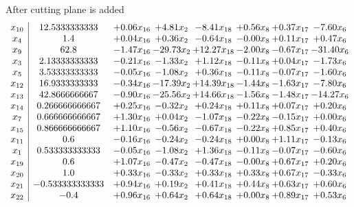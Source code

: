 \documentclass[8pt]{article}
\begin{document}
 After cutting plane is added 
\[\begin{array}{c| c c@{\hskip 2pt} c@{\hskip 2pt} c@{\hskip 2pt} c@{\hskip 2pt} c@{\hskip 2pt} c@{\hskip 2pt} }
 x_{10}   &  12.5333333333 & +  0.06 x_{16} & +  4.81 x_{2} & -8.41 x_{18} & +  0.56 x_{8} & +  0.37 x_{17} & -7.60 x_{6}\\
 x_{4}   &  1.4 & +  0.04 x_{16} & +  0.36 x_{2} & -0.64 x_{18} & -0.00 x_{8} & +  0.11 x_{17} & +  0.47 x_{6}\\
 x_{9}   &  62.8 & -1.47 x_{16} & -29.73 x_{2} & + 12.27 x_{18} & -2.00 x_{8} & -0.67 x_{17} & -31.40 x_{6}\\
 x_{3}   &  2.13333333333 & -0.21 x_{16} & -1.33 x_{2} & +  1.12 x_{18} & -0.11 x_{8} & +  0.04 x_{17} & -1.73 x_{6}\\
 x_{5}   &  3.53333333333 & -0.05 x_{16} & -1.08 x_{2} & +  0.36 x_{18} & -0.11 x_{8} & -0.07 x_{17} & -1.60 x_{6}\\
 x_{12}   &  16.9333333333 & -0.34 x_{16} & -17.39 x_{2} & + 14.39 x_{18} & -1.44 x_{8} & -1.63 x_{17} & -7.80 x_{6}\\
 x_{13}   &  42.8666666667 & -0.90 x_{16} & -25.56 x_{2} & + 14.66 x_{18} & -1.56 x_{8} & -1.48 x_{17} & -14.27 x_{6}\\
 x_{14}   &  0.266666666667 & +  0.25 x_{16} & -0.32 x_{2} & +  0.24 x_{18} & +  0.11 x_{8} & +  0.07 x_{17} & +  0.20 x_{6}\\
 x_{7}   &  0.666666666667 & +  1.30 x_{16} & +  0.04 x_{2} & -1.07 x_{18} & -0.22 x_{8} & -0.15 x_{17} & +  0.00 x_{6}\\
 x_{15}   &  0.866666666667 & +  1.10 x_{16} & -0.56 x_{2} & -0.67 x_{18} & -0.22 x_{8} & +  0.85 x_{17} & +  0.40 x_{6}\\
 x_{11}   &  0.6 & -0.16 x_{16} & -0.24 x_{2} & -0.24 x_{18} & +  0.00 x_{8} & +  1.11 x_{17} & -0.13 x_{6}\\
 x_{1}   &  0.533333333333 & -0.05 x_{16} & -1.08 x_{2} & +  1.36 x_{18} & -0.11 x_{8} & -0.07 x_{17} & -0.60 x_{6}\\
 x_{19}   &  0.6 & +  1.07 x_{16} & -0.47 x_{2} & -0.47 x_{18} & -0.00 x_{8} & +  0.67 x_{17} & +  0.20 x_{6}\\
 x_{20}   &  1.0 & +  0.33 x_{16} & -0.33 x_{2} & +  0.33 x_{18} & +  0.33 x_{8} & +  0.67 x_{17} & -0.33 x_{6}\\
 x_{21}   &  -0.533333333333 & +  0.94 x_{16} & +  0.19 x_{2} & +  0.41 x_{18} & +  0.44 x_{8} & +  0.63 x_{17} & +  0.60 x_{6}\\
 x_{22}   &  -0.4 & +  0.96 x_{16} & +  0.64 x_{2} & +  0.64 x_{18} & +  0.00 x_{8} & +  0.89 x_{17} & +  0.53 x_{6}\\

\end{array}\]
\end{document}
